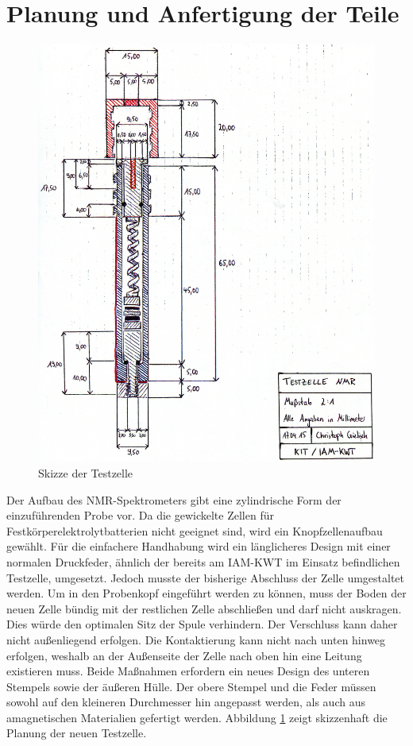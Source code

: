 \documentclass[a4paper, 11pt, headsepline,footsepline,twoside,abstract]{scrbook}
\begin{document}
\section{Planung und Anfertigung der Teile}
\begin{figure}
	\centering
	\includegraphics[width=1.0\columnwidth]{images/Skizze_Testzelle.jpg}
	\caption{Skizze der Testzelle}
	\label{skizze_testzelle}
\end{figure}
Der Aufbau des NMR-Spektrometers gibt eine zylindrische Form der einzuführenden Probe vor. Da die gewickelte Zellen für Festkörperelektrolytbatterien nicht geeignet sind, wird ein Knopfzellenaufbau gewählt. Für die einfachere Handhabung wird ein länglicheres Design mit einer normalen Druckfeder, ähnlich der bereits am IAM-KWT im Einsatz befindlichen Testzelle, umgesetzt. Jedoch musste der bisherige Abschluss der Zelle umgestaltet werden. Um in den Probenkopf eingeführt werden zu können, muss der Boden der neuen Zelle bündig mit der restlichen Zelle abschließen und darf nicht auskragen. Dies würde den optimalen Sitz der Spule verhindern. Der Verschluss kann daher nicht außenliegend erfolgen. Die Kontaktierung kann nicht nach unten hinweg erfolgen, weshalb an der Außenseite der Zelle nach oben hin eine Leitung existieren muss. Beide Maßnahmen erfordern ein neues Design des unteren Stempels sowie der äußeren Hülle. Der obere Stempel und die Feder müssen sowohl auf den kleineren Durchmesser hin angepasst werden, als auch aus amagnetischen Materialien gefertigt werden. Abbildung \ref{skizze_testzelle} zeigt skizzenhaft die Planung der neuen Testzelle.
\end{document}
